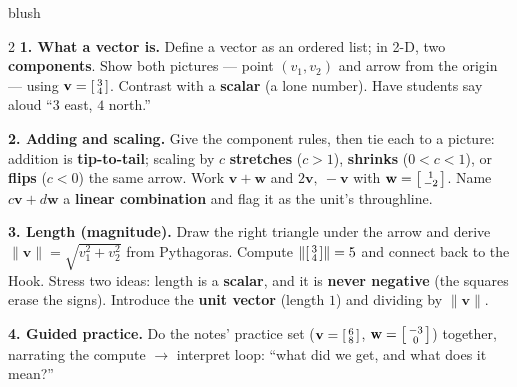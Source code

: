 \documentclass[10pt]{article}
\newcommand{\vv}{\mathbf{v}}
\newcommand{\ww}{\mathbf{w}}
\begin{document}
\begin{skillbox}[Lesson]{blush}
\begin{multicols}{2}
\textbf{1. What a vector is.} Define a vector as an ordered list; in 2-D, two
\textbf{components}. Show both pictures --- point $(v_1,v_2)$ and arrow from the origin ---
using $\vv=\begin{bsmallmatrix} 3\\4 \end{bsmallmatrix}$. Contrast with a \textbf{scalar}
(a lone number). Have students say aloud ``$3$ east, $4$ north.''

\textbf{2. Adding and scaling.} Give the component rules, then tie each to a picture:
addition is \textbf{tip-to-tail}; scaling by $c$ \textbf{stretches} ($c>1$),
\textbf{shrinks} ($0<c<1$), or \textbf{flips} ($c<0$) the same arrow. Work
$\vv+\ww$ and $2\vv,\ -\vv$ with $\ww=\begin{bsmallmatrix} 1\\-2 \end{bsmallmatrix}$. Name
$c\vv+d\ww$ a \textbf{linear combination} and flag it as the unit's throughline.

\columnbreak

\textbf{3. Length (magnitude).} Draw the right triangle under the arrow and derive
$\|\vv\|=\sqrt{v_1^2+v_2^2}$ from Pythagoras. Compute
$\left\|\begin{bsmallmatrix} 3\\4 \end{bsmallmatrix}\right\|=5$ and connect back to the Hook.
Stress two ideas: length is a \textbf{scalar}, and it is \textbf{never negative} (the squares
erase the signs). Introduce the \textbf{unit vector} (length $1$) and dividing by $\|\vv\|$.

\textbf{4. Guided practice.} Do the notes' practice set ($\vv=\begin{bsmallmatrix} 6\\8 \end{bsmallmatrix}$,
$\ww=\begin{bsmallmatrix} -3\\0 \end{bsmallmatrix}$) together, narrating the compute
$\rightarrow$ interpret loop: ``what did we get, and what does it mean?''
\end{multicols}
\end{skillbox}
\end{document}
